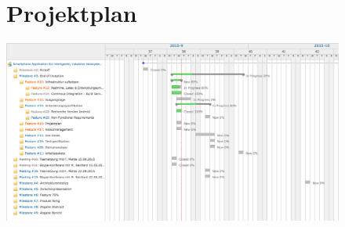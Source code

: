 
\clearpage
\begin{figure}
\section{Projektplan}
\label{sec:Projektplan}
\centering
\includegraphics[scale=0.5]{projectmanagement/res/projektplan.png}
\end{figure}
\clearpage
